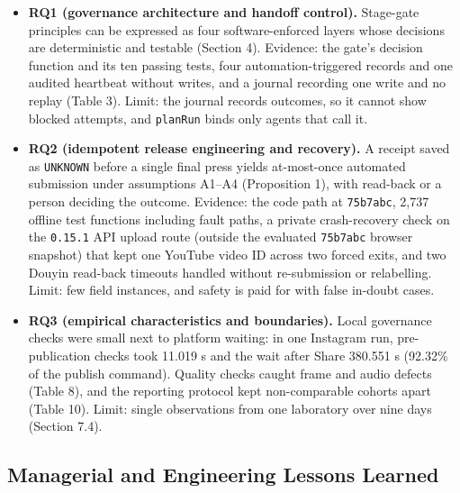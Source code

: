 \documentclass[11pt,a4paper]{article}
\theoremstyle{definition}
\begin{document}
\begin{itemize}[leftmargin=1.8em]
    \item \textbf{RQ1 (governance architecture and handoff control).} Stage-gate principles can be expressed as four software-enforced layers whose decisions are deterministic and testable (Section 4). Evidence: the gate's decision function and its ten passing tests, four automation-triggered records and one audited heartbeat without writes, and a journal recording one write and no replay (Table 3). Limit: the journal records outcomes, so it cannot show blocked attempts, and \texttt{planRun} binds only agents that call it.
    \item \textbf{RQ2 (idempotent release engineering and recovery).} A receipt saved as \texttt{UNKNOWN} before a single final press yields at-most-once automated submission under assumptions A1--A4 (Proposition 1), with read-back or a person deciding the outcome. Evidence: the code path at \texttt{75b7abc}, 2,737 offline test functions including fault paths, a private crash-recovery check on the \texttt{0.15.1} API upload route (outside the evaluated \texttt{75b7abc} browser snapshot) that kept one YouTube video ID across two forced exits, and two Douyin read-back timeouts handled without re-submission or relabelling. Limit: few field instances, and safety is paid for with false in-doubt cases.
    \item \textbf{RQ3 (empirical characteristics and boundaries).} Local governance checks were small next to platform waiting: in one Instagram run, pre-publication checks took 11.019 s and the wait after Share 380.551 s (92.32\% of the publish command). Quality checks caught frame and audio defects (Table 8), and the reporting protocol kept non-comparable cohorts apart (Table 10). Limit: single observations from one laboratory over nine days (Section 7.4).
\end{itemize}

\subsection{Managerial and Engineering Lessons Learned}
\label{sec:7.3}
\end{document}
